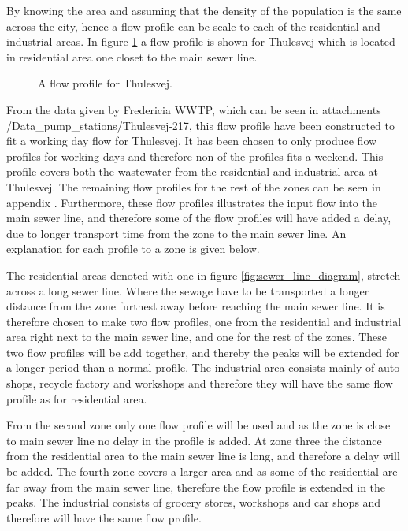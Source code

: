 By knowing the area and assuming that the density of the population is the same across the city, hence a flow profile can be scale to each of the residential and industrial areas. In figure \ref{fig:flow_profile_thulevej} a flow profile is shown for Thulesvej which is located in residential area one closet to the main sewer line. 


\begin{figure}[H]
\centering

\caption{A flow profile for Thulesvej.}
\label{fig:flow_profile_thulevej}
\end{figure}  

From the data given by Fredericia WWTP, which can be seen in attachments /Data\_pump\_stations/Thulesvej-217, this flow profile have been constructed to fit a working day flow for Thulesvej. It has been chosen to only produce flow profiles for working days and therefore non of the profiles fits a weekend. This profile covers both the wastewater from the residential and industrial area at Thulesvej. The remaining flow profiles for the rest of the zones can be seen in appendix . Furthermore, these flow profiles illustrates the input flow into the main sewer line, and therefore some of the flow profiles will have added a delay, due to longer transport time from the zone to the main sewer line. An explanation for each profile to a zone is given below.    

The residential areas denoted with one in figure \ref{fig:sewer_line_diagram}, stretch across a long sewer line. Where the sewage have to be transported a longer distance from the zone furthest away before reaching the main sewer line. It is therefore chosen to make two flow profiles, one from the residential and industrial area right next to the main sewer line, and one for the rest of the zones. These two flow profiles will be add together, and thereby the peaks will be extended for a longer period than a normal profile. The industrial area consists mainly of auto shops, recycle factory and workshops and therefore they will have the same flow profile as for residential area. 

From the second zone only one flow profile will be used and as the zone is close to main sewer line no delay in the profile is added. At zone three the distance from the residential area to the main sewer line is long, and therefore a delay will be added. The fourth zone covers a larger area and as some of the residential are far away from the main sewer line, therefore the flow profile is extended in the peaks. The industrial consists of grocery stores, workshops and car shops and therefore will have the same flow profile.

